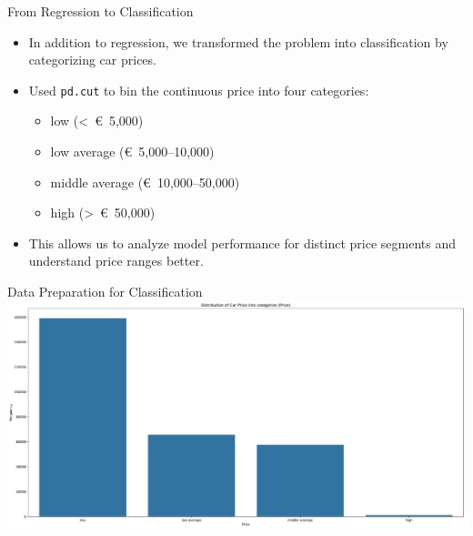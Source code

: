 \documentclass{beamer}
\begin{document}
\begin{frame}{From Regression to Classification}
        \begin{itemize}
                \item In addition to regression, we transformed the problem
                        into classification by categorizing car prices.
                \item Used \texttt{pd.cut} to bin the continuous price into
                        four categories:
                        \begin{itemize}
                                \item low (\textless~€~5,000)
                                \item low average (€~5,000–10,000)
                                \item middle average (€~10,000–50,000)
                                \item high (\textgreater~€~50,000)
                        \end{itemize}
                \item This allows us to analyze model performance for distinct
                        price segments and understand price ranges better.
        \end{itemize}
\end{frame}

\begin{frame}{Data Preparation for Classification}
        \includegraphics[width=\linewidth]{bins.pdf}
\end{frame}
\end{document}
